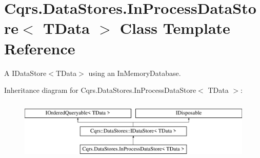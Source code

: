 \hypertarget{classCqrs_1_1DataStores_1_1InProcessDataStore}{}\section{Cqrs.\+Data\+Stores.\+In\+Process\+Data\+Store$<$ T\+Data $>$ Class Template Reference}
\label{classCqrs_1_1DataStores_1_1InProcessDataStore}


A I\+Data\+Store$<$\+T\+Data$>$ using an In\+Memory\+Database.  


Inheritance diagram for Cqrs.\+Data\+Stores.\+In\+Process\+Data\+Store$<$ T\+Data $>$\+:\begin{figure}[H]
\begin{center}
\leavevmode
\includegraphics[height=2.947368cm]{classCqrs_1_1DataStores_1_1InProcessDataStore}
\end{center}
\end{figure}
